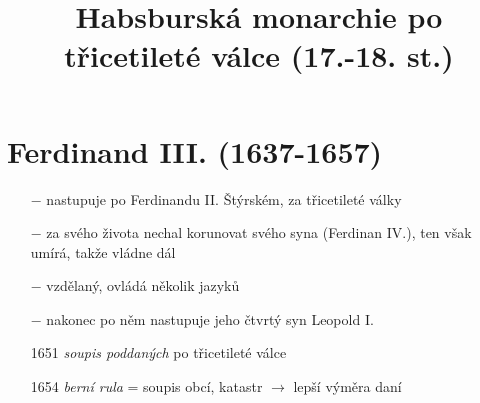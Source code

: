 \documentclass{article}
\title{\vspace{-2cm}Habsburská monarchie po třicetileté válce (17.-18. st.)\vspace{-1.7cm}}
\date{}
\author{}
\begin{document}
\maketitle

\section*{Ferdinand III. (1637-1657)}

\begin{itemize}
    \vspace{-0.5em}
    \setlength\itemsep{0.15em}
    \item[$-$] nastupuje po Ferdinandu II. Štýrském, za třicetileté války
    \item[$-$] za svého života nechal korunovat svého syna (Ferdinan IV.), ten však umírá, takže vládne dál
    \item[$-$] vzdělaný, ovládá několik jazyků
    \item[$-$] nakonec po něm nastupuje jeho čtvrtý syn Leopold I.
    \item[1651] \textit{soupis poddaných} po třicetileté válce
    \item[1654] \textit{berní rula} = soupis obcí, katastr $\rightarrow$ lepší výměra daní
\end{itemize}
\end{document}
